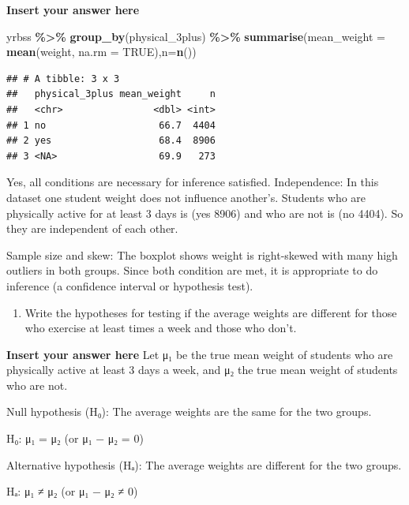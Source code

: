 \documentclass[
]{article}
\newenvironment{Shaded}{\begin{snugshade}}{\end{snugshade}}
\newcommand{\AttributeTok}[1]{\textcolor[rgb]{0.13,0.29,0.53}{#1}}
\newcommand{\ConstantTok}[1]{\textcolor[rgb]{0.56,0.35,0.01}{#1}}
\newcommand{\FunctionTok}[1]{\textcolor[rgb]{0.13,0.29,0.53}{\textbf{#1}}}
\newcommand{\NormalTok}[1]{#1}
\newcommand{\SpecialCharTok}[1]{\textcolor[rgb]{0.81,0.36,0.00}{\textbf{#1}}}
\providecommand{\tightlist}{%
  \setlength{\itemsep}{0pt}\setlength{\parskip}{0pt}}
\begin{document}
\textbf{Insert your answer here}

\begin{Shaded}
\begin{Highlighting}[]
\NormalTok{yrbss }\SpecialCharTok{\%\textgreater{}\%}
  \FunctionTok{group\_by}\NormalTok{(physical\_3plus) }\SpecialCharTok{\%\textgreater{}\%}
  \FunctionTok{summarise}\NormalTok{(}\AttributeTok{mean\_weight =} \FunctionTok{mean}\NormalTok{(weight, }\AttributeTok{na.rm =} \ConstantTok{TRUE}\NormalTok{),}\AttributeTok{n=}\FunctionTok{n}\NormalTok{())}
\end{Highlighting}
\end{Shaded}

\begin{verbatim}
## # A tibble: 3 x 3
##   physical_3plus mean_weight     n
##   <chr>                <dbl> <int>
## 1 no                    66.7  4404
## 2 yes                   68.4  8906
## 3 <NA>                  69.9   273
\end{verbatim}

Yes, all conditions are necessary for inference satisfied. Independence:
In this dataset one student weight does not influence another's.
Students who are physically active for at least 3 days is (yes 8906) and
who are not is (no 4404). So they are independent of each other.

Sample size and skew: The boxplot shows weight is right-skewed with many
high outliers in both groups. Since both condition are met, it is
appropriate to do inference (a confidence interval or hypothesis test).

\begin{enumerate}
\def\labelenumi{\arabic{enumi}.}
\setcounter{enumi}{4}
\tightlist
\item
  Write the hypotheses for testing if the average weights are different
  for those who exercise at least times a week and those who don't.
\end{enumerate}

\textbf{Insert your answer here} Let μ₁ be the true mean weight of
students who are physically active at least 3 days a week, and μ₂ the
true mean weight of students who are not.

Null hypothesis (H₀): The average weights are the same for the two
groups.

H₀: μ₁ = μ₂ (or μ₁ − μ₂ = 0)

Alternative hypothesis (Hₐ): The average weights are different for the
two groups.

Hₐ: μ₁ ≠ μ₂ (or μ₁ − μ₂ ≠ 0)
\end{document}
